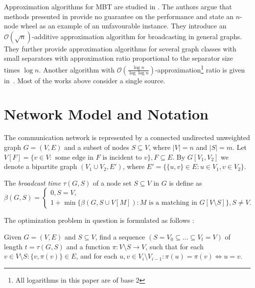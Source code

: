 Approximation algorithms for MBT are studied in \cite{kortsarz95}. 
The authors argue that methods presented in \cite{scheuermann84} provide no guarantee on the performance and state an $n$-node wheel as an example of an unfavourable instance.
They introduce an $\mathcal{O}(\sqrt{n})$-additive approximation algorithm for broadcasting in general graphs.
They further provide approximation algorithms for several graph classes with small separators with approximation ratio proportional to the separator size times $\log n$.
Another algorithm with $\mathcal{O}\left(\frac{\log n}{\log \log n}\right)$-approximation\footnote{All logarithms in this paper are of base 2} ratio is given in~\cite{elkin03}.
Most of the works above consider a single source.

\section{Network Model and Notation}

The communication network is represented by a connected undirected unweighted graph $G=(V,E)$ and a subset of nodes $S\subseteq V$, where $|V|=n$ and $|S|=m$. 
Let $V\left[F\right]=\{v\in V:\text{ some edge in } F \text{ is incident to } v\}, F\subseteq E$.
By $G\left[V_1,V_2\right]$ we denote a bipartite graph $(V_1\cup V_2,E')$, where  $E'=\{\{u,v\}\in E: u\in V_1,v\in V_2\}$. 
\begin{definition}
The \emph{broadcast time} $\tau(G,S)$ of a node set $S\subseteq V$ in $G$ is define as 
\begin{equation*}
\beta(G,S)=
\begin{cases}
	0, S=V,\\
	1+\min\{\beta(G,S\cup V\left[M\right]):M \text{ is a matching in } G\left[V\setminus S\right]\}, S\neq V.
\end{cases}
\label{eq:btime}
\end{equation*}
\end{definition}
The optimization problem in question is formulated as follows \cite{jansen95,middendorf93}:
\begin{problem}\label{prob:min}
Given $G=(V,E)$ and $S\subseteq V$, find a sequence $(S=V_0\subseteq\dots\subseteq V_t=V)$ of length $t=\tau(G,S)$ 
and a function $\pi:V\setminus S\to V$, such that for each $v\in V\setminus S:\{v,\pi(v)\}\in E$, and for each $u,v\in V_i\setminus V_{i-1}: \pi(u)=\pi(v)\Leftrightarrow u=v$.
\end{problem}

